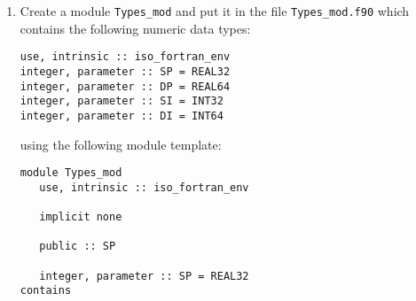 \documentclass[12pt]{article}
\begin{document}
\begin{enumerate}
\item Create a module \texttt{Types\_mod} and put it in the file \texttt{Types\_mod.f90} which 
contains the following numeric data types:
\begin{verbatim}
use, intrinsic :: iso_fortran_env
integer, parameter :: SP = REAL32
integer, parameter :: DP = REAL64
integer, parameter :: SI = INT32
integer, parameter :: DI = INT64
\end{verbatim}
using the following module template:
\begin{verbatim}
module Types_mod
   use, intrinsic :: iso_fortran_env

   implicit none

   public :: SP

   integer, parameter :: SP = REAL32
contains


\end{verbatim}
\end{enumerate}
\end{document}
